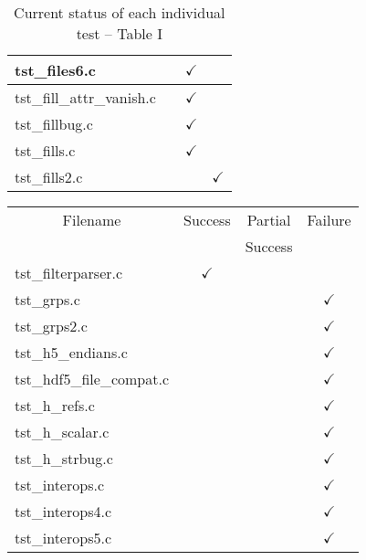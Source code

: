 \begin{table}[H]
\begin{tabular}{|l|c|c|c|}
tst\_files6.c           &               & $\checkmark$  &               \\ \hline
tst\_fill\_attr\_vanish.c   &           & $\checkmark$  &               \\ \hline
tst\_fillbug.c          &               & $\checkmark$  &               \\ \hline
tst\_fills.c            &               & $\checkmark$  &               \\ \hline
tst\_fills2.c           &               &               & $\checkmark$  \\ \hline
\hline
\end{tabular}
\caption{\label{tab:nc_test4_status_1} Current status of each individual test -- Table I}
\end{table}

\begin{table}[H]
\centering
\begin{tabular}{|l|c|c|c|}
\hline
\multicolumn{1}{|c|}{\parbox{8cm}{\centering Filename}} & \multicolumn{1}{c|}{Success} & \multicolumn{1}{c|}{Partial} & \multicolumn{1}{c|}{Failure} \\
& &                 Success  &                              \\ \hline \hline
tst\_filterparser.c     & $\checkmark$  &               &               \\ \hline
tst\_grps.c             &               &               & $\checkmark$  \\ \hline
tst\_grps2.c            &               &               & $\checkmark$  \\ \hline
tst\_h5\_endians.c      &               &               & $\checkmark$  \\ \hline
tst\_hdf5\_file\_compat.c   &           &               & $\checkmark$  \\ \hline
tst\_h\_refs.c          &               &               & $\checkmark$  \\ \hline
tst\_h\_scalar.c        &               &               & $\checkmark$  \\ \hline
tst\_h\_strbug.c        &               &               & $\checkmark$  \\ \hline
tst\_interops.c         &               &               & $\checkmark$  \\ \hline
tst\_interops4.c        &               &               & $\checkmark$  \\ \hline
tst\_interops5.c        &               &               & $\checkmark$  \\ \hline

\end{tabular}
\end{table}
